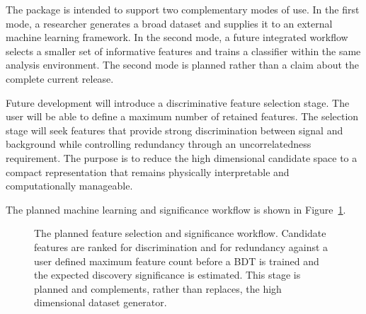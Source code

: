 \documentclass[11pt,a4paper]{article}
\begin{document}
The package is intended to support two complementary modes of use. In the first
mode, a researcher generates a broad dataset and supplies it to an external
machine learning framework. In the second mode, a future integrated workflow
selects a smaller set of informative features and trains a classifier within the
same analysis environment. The second mode is planned rather than a claim about
the complete current release.

Future development will introduce a discriminative feature selection stage. The
user will be able to define a maximum number of retained features. The selection
stage will seek features that provide strong discrimination between signal and
background while controlling redundancy through an uncorrelatedness requirement.
The purpose is to reduce the high dimensional candidate space to a compact
representation that remains physically interpretable and computationally
manageable.

The planned machine learning and significance workflow is shown in
Figure~\ref{fig:planned}.

\begin{figure}[t]
\centering
{}
\caption{The planned feature selection and significance workflow. Candidate
features are ranked for discrimination and for redundancy against a user defined
maximum feature count before a BDT is trained and the expected discovery
significance is estimated. This stage is planned and complements, rather than
replaces, the high dimensional dataset generator.}
\label{fig:planned}
\end{figure}
\end{document}
